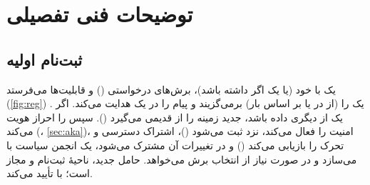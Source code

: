 \documentclass[11pt,a4paper]{article}
\begin{document}
\section{توضیحات فنی تفصیلی}

\subsection{ثبت‌نام اولیه}
 یک  با  خود (یا یک  اگر داشته باشد)، برش‌های درخواستی () و
قابلیت‌ها می‌فرستد (\cref{fig:reg}) \cite{ts23502}.  یک  را (از  در  یا بر اساس بار)
برمی‌گزیند و پیام را در یک  هدایت می‌کند. اگر  یک  از  دیگری داده باشد،
 جدید زمینه را از  قدیمی می‌گیرد (). سپس   را
احراز هویت می‌کند (، \cref{sec:aka})، امنیت  را فعال می‌کند، نزد  ثبت می‌شود
()، اشتراک دسترسی و تحرک را بازیابی می‌کند () و در تغییرات آن مشترک می‌شود، یک انجمن
سیاست  با  می‌سازد و در صورت نیاز از  انتخاب برش می‌خواهد.  حامل
 جدید، ناحیهٔ ثبت‌نام و  مجاز است؛  با  تأیید می‌کند.

\begin{acnfigure}
  \caption{ثبت‌نام اولیه با  (ساده‌شده) \cite{ts23502,ts33501}.}
  \label{fig:reg}
\end{acnfigure}
\end{document}
